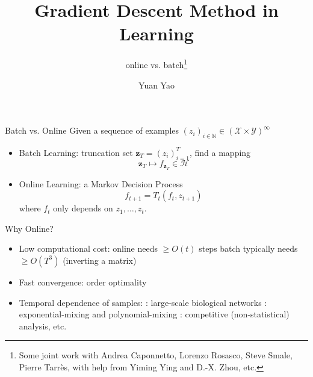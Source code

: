 \documentclass[pdf,autumn,slideColor,colorBG]{prosper}
\title{Gradient Descent Method in Learning}
\subtitle{online vs. batch\footnote{Some joint work with Andrea Caponnetto, Lorenzo Rosasco, Steve Smale, Pierre Tarr\`es, with help from
Yiming Ying and D.-X. Zhou, etc.}}
\author{Yuan Yao}
\theoremstyle{theorem}
\theoremstyle{definition}
\theoremstyle{remark}
\def\H{{\mathscr H}}
\def\X{{\mathcal X}}
\def\Y{{\mathcal Y}}
\def\N{{\mathbb N}}
\def\z{{\mathbf z}}
\begin{document}
\maketitle


%
\begin{slide}{Batch vs. Online}
Given a sequence of examples $(z_i)_{i\in \N}\in (\X\times \Y)^\infty$

\begin{itemize}
    \item Batch Learning: truncation set $\z_T=(z_i)_{i=1}^T$, find a mapping
\[ \z_T \mapsto f_{\z_T} \in \H \]

    \item Online Learning: a Markov Decision Process
\[ f_{t+1} = T_t(f_{t},z_{t+1}) \]
where $f_t$ only depends on $z_1,\ldots,z_t$.

\end{itemize}
\end{slide}


%
\begin{slide}{Why Online?}
\begin{itemize}
    \item Low computational cost:
        \subitem online needs $\geq O(t)$ steps
        \subitem batch typically needs $\geq O(T^3)$ (inverting a matrix)
    \item Fast convergence: order optimality
    \item Temporal dependence of samples:
        : large-scale biological networks
        : exponential-mixing and polynomial-mixing
        : competitive (non-statistical) analysis, etc.
\end{itemize}
\end{slide}
\end{document}
